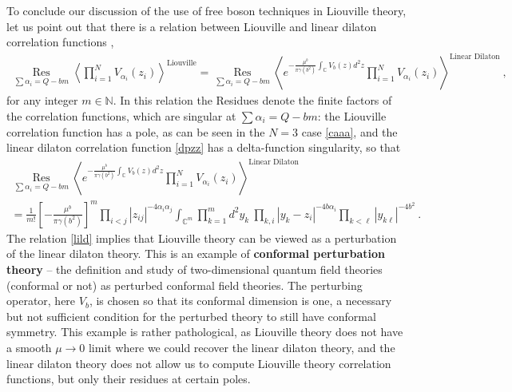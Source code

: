 \documentclass[12pt,a4paper,notitlepage]{report}
\numberwithin{equation}{section}
\theoremstyle{break}
\begin{document}
To conclude our discussion of the use of free boson techniques in Liouville theory, let us point out that there is a relation between Liouville and linear dilaton correlation functions \cite{zz95},
\begin{align}
 \underset{\sum \alpha_i = Q-bm}{\operatorname{Res}} \left\langle \prod_{i=1}^N V_{\alpha_i}(z_i)\right\rangle^{\text{Liouville}} = \underset{\sum\alpha_i = Q-bm}{\operatorname{Res}} \left\langle e^{-\frac{\mu^b}{\pi\gamma(b^2)}\int_{\mathbb{C}} V_b(z)d^2z}\prod_{i=1}^N V_{\alpha_i}(z_i)\right\rangle^{\text{Linear\ Dilaton}}\ , 
\label{lild}
\end{align}
for any integer $m\in {\mathbb{N}}$.
In this relation the Residues denote the finite factors of the correlation functions, which are singular at $\sum \alpha_i = Q-bm$: the Liouville correlation function has a pole, as can be 
seen in the $N=3$ case \eqref{caaa}, and the linear dilaton correlation function \eqref{dpzz} has a delta-function singularity, so that 
\begin{multline}
 \underset{\sum\alpha_i = Q-bm}{\operatorname{Res}} \left\langle e^{-\frac{\mu^b}{\pi\gamma(b^2)}\int_{\mathbb{C}} V_b(z)d^2z}\prod_{i=1}^N V_{\alpha_i}(z_i)\right\rangle^{\text{Linear\ Dilaton}}
\\
= \frac{1}{m!}\left[-\frac{\mu^b}{\pi\gamma(b^2)}\right]^m \prod_{i<j} |z_{ij}|^{-4\alpha_i\alpha_j} \int_{{\mathbb{C}}^m} \prod_{k=1}^m d^2y_k\ \prod_{k,i} |y_k-z_i|^{-4b\alpha_i}\prod_{k<\ell} |y_{k\ell}|^{-4b^2}\ .
\label{mint}
\end{multline}
The relation \eqref{lild} implies that Liouville theory can be viewed as a perturbation of the linear dilaton theory.
This is an example of \textbf{\boldmath conformal perturbation theory} -- the definition and study of two-dimensional quantum field theories (conformal or not) as perturbed conformal field theories.
The perturbing operator, here $V_b$, is chosen so that its conformal dimension is one, a necessary but not sufficient condition for the perturbed theory to still have conformal symmetry.
This example is rather pathological, as Liouville theory does not have a smooth $\mu\rightarrow 0$ limit where we could recover the linear dilaton theory, and the linear dilaton theory does not allow us to compute Liouville theory correlation functions, but only their residues at certain poles. 
\end{document}
